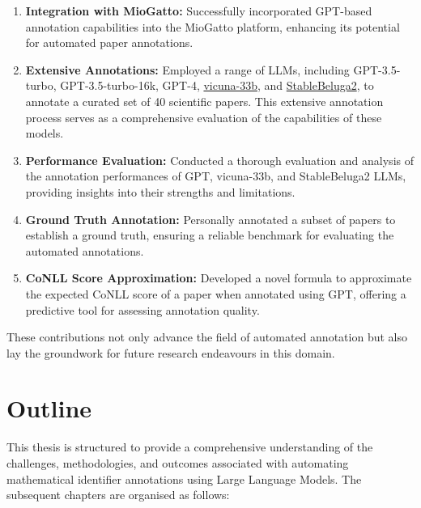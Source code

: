 \begin{enumerate}
    \item \textbf{Integration with MioGatto:} Successfully incorporated GPT-based annotation capabilities into the MioGatto platform, enhancing its potential for automated paper annotations.
    
    \item \textbf{Extensive Annotations:} Employed a range of LLMs, including GPT-3.5-turbo, GPT-3.5-turbo-16k, GPT-4, \href{https://huggingface.co/TheBloke/Vicuna-33B-1-3-SuperHOT-8K-GPTQ}{vicuna-33b}, and \href{https://huggingface.co/TheBloke/StableBeluga2-70B-GPTQ}{StableBeluga2}, to annotate a curated set of 40 scientific papers. This extensive annotation process serves as a comprehensive evaluation of the capabilities of these models.
    
    \item \textbf{Performance Evaluation:} Conducted a thorough evaluation and analysis of the annotation performances of GPT, vicuna-33b, and StableBeluga2 LLMs, providing insights into their strengths and limitations.
    
    \item \textbf{Ground Truth Annotation:} Personally annotated a subset of papers to establish a ground truth, ensuring a reliable benchmark for evaluating the automated annotations.
    
    \item \textbf{CoNLL Score Approximation:} Developed a novel formula to approximate the expected CoNLL score of a paper when annotated using GPT, offering a predictive tool for assessing annotation quality.
\end{enumerate}

These contributions not only advance the field of automated annotation but also lay the groundwork for future research endeavours in this domain.

\section{Outline}

This thesis is structured to provide a comprehensive understanding of the challenges, methodologies, and outcomes associated with automating mathematical identifier annotations using Large Language Models. The subsequent chapters are organised as follows:


